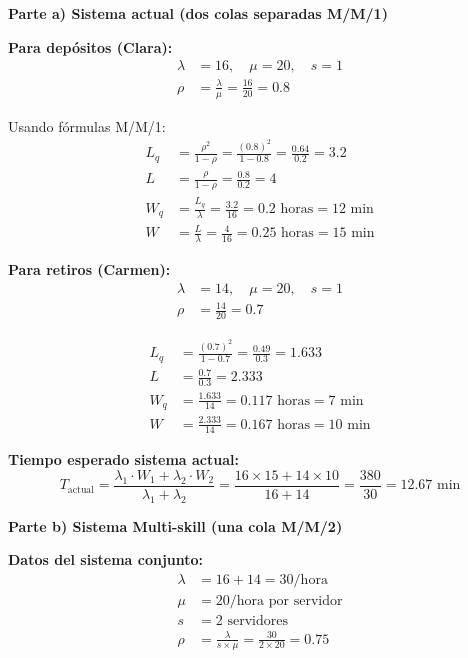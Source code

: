 \documentclass[12pt, a4paper, oneside]{book}
\theoremstyle{definition}
\begin{document}
\textbf{Parte a) Sistema actual (dos colas separadas M/M/1)}

\textbf{Para depósitos (Clara):}
\begin{align*}
\lambda &= 16, \quad \mu = 20, \quad s = 1 \\
\rho &= \frac{\lambda}{\mu} = \frac{16}{20} = 0.8
\end{align*}

Usando fórmulas M/M/1:
\begin{align*}
L_q &= \frac{\rho^2}{1-\rho} = \frac{(0.8)^2}{1-0.8} = \frac{0.64}{0.2} = 3.2 \\
L &= \frac{\rho}{1-\rho} = \frac{0.8}{0.2} = 4 \\
W_q &= \frac{L_q}{\lambda} = \frac{3.2}{16} = 0.2 \text{ horas} = 12 \text{ min} \\
W &= \frac{L}{\lambda} = \frac{4}{16} = 0.25 \text{ horas} = 15 \text{ min}
\end{align*}

\textbf{Para retiros (Carmen):}
\begin{align*}
\lambda &= 14, \quad \mu = 20, \quad s = 1 \\
\rho &= \frac{14}{20} = 0.7
\end{align*}

\begin{align*}
L_q &= \frac{(0.7)^2}{1-0.7} = \frac{0.49}{0.3} = 1.633 \\
L &= \frac{0.7}{0.3} = 2.333 \\
W_q &= \frac{1.633}{14} = 0.117 \text{ horas} = 7 \text{ min} \\
W &= \frac{2.333}{14} = 0.167 \text{ horas} = 10 \text{ min}
\end{align*}

\textbf{Tiempo esperado sistema actual:}
$$T_{\text{actual}} = \frac{\lambda_1 \cdot W_1 + \lambda_2 \cdot W_2}{\lambda_1 + \lambda_2} = \frac{16 \times 15 + 14 \times 10}{16+14} = \frac{380}{30} = 12.67 \text{ min}$$

\textbf{Parte b) Sistema Multi-skill (una cola M/M/2)}

\textbf{Datos del sistema conjunto:}
\begin{align*}
\lambda &= 16 + 14 = 30\text{/hora} \\
\mu &= 20\text{/hora por servidor} \\
s &= 2 \text{ servidores} \\
\rho &= \frac{\lambda}{s \times \mu} = \frac{30}{2 \times 20} = 0.75
\end{align*}
\end{document}

